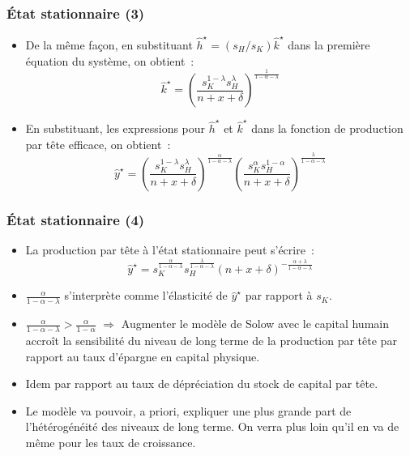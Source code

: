 \documentclass[10pt,notheorems]{beamer}
\theoremstyle{plain}
\theoremstyle{definition} %
\begin{document}
\begin{frame}
  \frametitle{État stationnaire (3)}

  \begin{itemize}

    \item De la même façon, en substituant $\hat h^\star = (s_H/s_K)\hat k^\star$ dans la première équation du système, on obtient~:
      \medskip
      \[
        \hat k^\star = \left(\frac{s_K^{1-\lambda} s_H^{\lambda}}{n+x+\delta}\right)^{\frac{1}{1-\alpha-\lambda}}
      \]
      \medskip

    \item En substituant, les expressions pour $\hat h^{\star}$ et $\hat k^{\star}$ dans la fonction de production par tête efficace, on obtient~:
      \[
        \hat y^{\star} = \left(\frac{s_K^{1-\lambda} s_H^{\lambda}}{n+x+\delta}\right)^{\frac{\alpha}{1-\alpha-\lambda}}
        \left(\frac{s_K^\alpha s_H^{1-\alpha}}{n+x+\delta}\right)^{\frac{\lambda}{1-\alpha-\lambda}}
      \]

  \end{itemize}

\end{frame}


\begin{frame}
  \frametitle{État stationnaire (4)}

  \begin{itemize}

  \item La production par tête à l'état stationnaire peut s'écrire~:
    \[
      \hat y^\star =  s_K^{\frac{\alpha}{1-\alpha-\lambda}}s_H^{\frac{\lambda}{1-\alpha-\lambda}}(n+x+\delta)^{-\frac{\alpha+\lambda}{1-\alpha-\lambda}}
    \]

  \item $\frac{\alpha}{1-\alpha-\lambda}$ s'interprète comme l'élasticité de $\hat y^{\star}$ par rapport à $s_K$.\newline

  \item $\frac{\alpha}{1-\alpha-\lambda}>\frac{\alpha}{1-\alpha}$ $\Rightarrow$ Augmenter le modèle de Solow avec le capital humain accroît la sensibilité du niveau de long terme de la production par tête par rapport au taux d'épargne en capital physique.\newline

  \item Idem par rapport au taux de dépréciation du stock de capital par tête.\newline

  \item Le modèle va pouvoir, a priori, expliquer une plus grande part de l'hétérogénéité des niveaux de long terme. On verra plus loin qu'il en va de même pour les taux de croissance.

  \end{itemize}

\end{frame}
\end{document}
